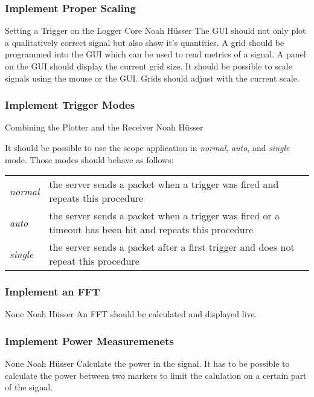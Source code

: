\documentclass[a4paper,oneside]{alpenspecs/alpenspecs}
\begin{document}
\subsubsection{Implement Proper Scaling}
\label{subsec:frontend:}
\wpac
     {}
     {}
     {}
     {Setting a Trigger on the Logger Core}
     {}
     {Noah Hüsser}
     {%
         The GUI should not only plot a qualitatively correct signal but also show it's quantities.
         A grid should be programmed into the GUI which can be used to read metrics of a signal. A panel on the GUI should display the current grid size.
         It should be possible to scale signals using the mouse or the GUI. Grids should adjust with the current scale.
     }

\subsubsection{Implement Trigger Modes}
\label{subsec:frontend:}
\wpac
     {}
     {}
     {}
     {Combining the Plotter and the Receiver}
     {}
     {Noah Hüsser}
     {%
         It should be possible to use the scope application in \textit{normal}, \textit{auto}, and \textit{single} mode. Those modes should behave as follows:
         \begin{tabular}{l l}
            \textit{normal} & the server sends a packet when a trigger was fired and repeats this procedure \\
            \textit{auto} & the server sends a packet when a trigger was fired or a timeout has been hit and repeats this procedure \\
            \textit{single} & the server sends a packet after a first trigger and does not repeat this procedure
         \end{tabular}
     }

 \subsubsection{Implement an FFT}
\label{subsec:frontend:}
\wpac
     {}
     {}
     {}
     {None}
     {}
     {Noah Hüsser}
     {%
         An FFT should be calculated and displayed live.
     }

\subsubsection{Implement Power Measuremenets}
\label{subsec:frontend:}
\wpac
     {}
     {}
     {}
     {None}
     {}
     {Noah Hüsser}
     {%
         Calculate the power in the signal.
         It has to be possible to calculate the power between two markers to limit the calulation on a certain part of the signal.
     }
\end{document}
